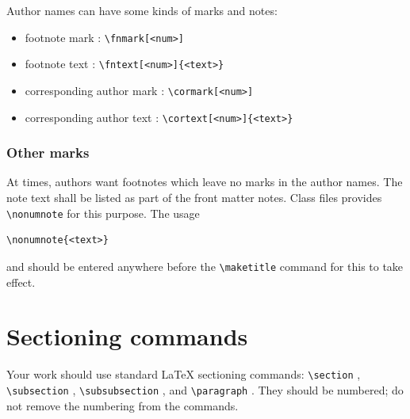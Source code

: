 \documentclass[%
]{ceurart}
\begin{document}
Author names can have some kinds of marks and notes:
\begin{itemize}
\item footnote mark :
\verb|\fnmark[<num>]|

\item footnote text :
\verb|\fntext[<num>]{<text>}|

\item corresponding author mark :
\verb|\cormark[<num>]|

\item corresponding author text :
\verb|\cortext[<num>]{<text>}|

\end{itemize}

\subsubsection{Other marks}

At times, authors want footnotes which leave no marks in the author names. The note text shall be listed as part of the front matter notes. Class files provides
\verb|\nonumnote|
 for this purpose. The usage
\begin{lstlisting}[language={[latex]TeX}]
\nonumnote{<text>}
\end{lstlisting}
and should be entered anywhere before the
\verb|\maketitle|
 command for this to take effect.

\section{Sectioning commands}

Your work should use standard \LaTeX{} sectioning commands:
\verb|\section|%
,
\verb|\subsection|%
,
\verb|\subsubsection|%
, and
\verb|\paragraph|%
.
They should be numbered; do not remove the numbering from the commands.
\end{document}
